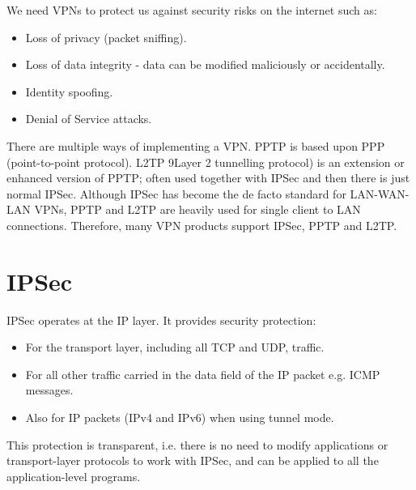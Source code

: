 \documentclass{article}
\begin{document}
We need VPNs to protect us against security risks on the internet such as:
\begin{itemize}
  \item Loss of privacy (packet sniffing).
  \item Loss of data integrity - data can be modified maliciously or accidentally.
  \item Identity spoofing.
  \item Denial of Service attacks.
\end{itemize}
There are multiple ways of implementing a VPN. PPTP is based upon PPP (point-to-point protocol). L2TP 9Layer 2 tunnelling protocol) is an extension or enhanced version of PPTP; often used together with IPSec and then there is just normal IPSec. Although IPSec has become the de facto standard for LAN-WAN-LAN VPNs, PPTP and L2TP are heavily used for single client to LAN connections. Therefore, many VPN products support IPSec, PPTP and L2TP.

\section{IPSec}
IPSec operates at the IP layer. It provides security protection:
\begin{itemize}
  \item For the transport layer, including all TCP and UDP, traffic.
  \item For all other traffic carried in the data field of the IP packet e.g. ICMP messages.
  \item Also for IP packets (IPv4 and IPv6) when using tunnel mode.
\end{itemize}
This protection is transparent, i.e. there is no need to modify applications or transport-layer protocols to work with IPSec, and can be applied to all the application-level programs.
\end{document}
